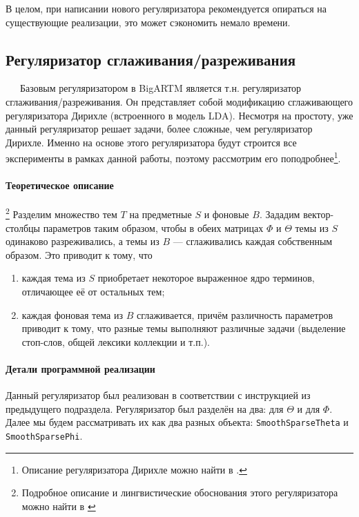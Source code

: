 В целом, при написании нового регуляризатора рекомендуется опираться на существующие реализации, это может сэкономить немало времени.

\subsection{Регуляризатор сглаживания/разреживания}

$\quad\;\:$Базовым регуляризатором в BigARTM является т.н. регуляризатор сглаживания/разреживания. Он представляет собой модификацию сглаживающего регуляризатора Дирихле (встроенного в модель LDA). Несмотря на простоту, уже данный регуляризатор решает задачи, более сложные, чем регуляризатор Дирихле. Именно на основе этого регуляризатора будут строится все эксперименты в рамках данной работы, поэтому рассмотрим его поподробнее\footnote{Описание регуляризатора Дирихле можно найти в \cite{voron2013ptm}.}.

\paragraph{Теоретическое описание}\footnote{Подробное описание и лингвистические обоснования этого регуляризатора можно найти в \cite{voron_potap_14}}
Разделим множество тем $T$ на предметные $S$ и фоновые $B$. Зададим вектор-столбцы параметров таким образом, чтобы в обеих матрицах $\Phi$ и $\Theta$ темы из $S$ одинаково разреживались, а темы из $B$ --- сглаживались каждая собственным образом. Это приводит к тому, что 

\begin{enumerate}
	\item каждая тема из $S$ приобретает некоторое выраженное ядро терминов, отличающее её от остальных тем;
	\item каждая фоновая тема из $B$ сглаживается, причём различность параметров приводит к тому, что разные темы выполняют различные задачи (выделение стоп-слов, общей лексики коллекции и т.п.).
\end{enumerate}

\paragraph{Детали программной реализации}
Данный регуляризатор был реализован в соответствии с инструкцией из предыдущего подраздела. Регуляризатор был разделён на два: для $\Theta$ и для $\Phi$. Далее мы будем рассматривать их как два разных объекта: \verb'SmoothSparseTheta' и \verb'SmoothSparsePhi'. 

